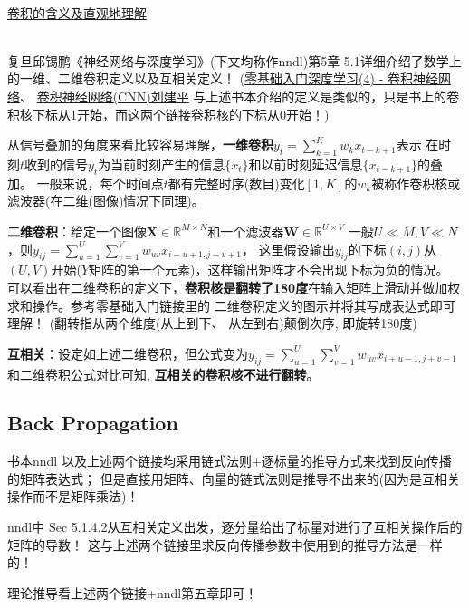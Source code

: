 \documentclass[UTF8]{article}
\begin{document}
\hspace*{\fill} \\
    \href{https://www.zhihu.com/question/22298352/answer/637156871}{卷积的含义及直观地理解}

\hspace*{\fill} \\
    复旦邱锡鹏《神经网络与深度学习》(下文均称作nndl)第5章 5.1详细介绍了数学上的一维、二维卷积定义以及互相关定义！
    (\href{https://www.zybuluo.com/hanbingtao/note/485480}{零基础入门深度学习(4) - 卷积神经网络}、
    \href{https://www.cnblogs.com/pinard/p/6483207.html}{卷积神经网络(CNN)刘建平}
    与上述书本介绍的定义是类似的，只是书上的卷积核下标从1开始，而这两个链接卷积核的下标从0开始！)

    从信号叠加的角度来看比较容易理解，\textbf{一维卷积}$y_{t}=\sum_{k=1}^{K} w_{k} x_{t-k+1}$表示
    在时刻$t$收到的信号$y_t$为当前时刻产生的信息$\{x_{t}\}$和以前时刻延迟信息$\{x_{t-k+1}\}$的叠加。
    一般来说，每个时间点$t$都有完整时序(数目)变化$[1,K]$的$w_{k}$被称作卷积核或滤波器(在二维(图像)情况下同理)。

    \textbf{二维卷积}：给定一个图像$\boldsymbol{X} \in \mathbb{R}^{M \times N}$和一个滤波器$\boldsymbol{W} \in \mathbb{R}^{U \times V}$
    一般$U \ll M, V \ll N$，则$y_{i j}=\sum_{u=1}^{U} \sum_{v=1}^{V} w_{u v} x_{i-u+1, j-v+1}$，
    这里假设输出$y_{ij}$的下标$(i, j)$从$(U, V)$开始($Y$矩阵的第一个元素)，这样输出矩阵才不会出现下标为负的情况。
    可以看出在二维卷积的定义下，\textbf{卷积核是翻转了180度}在输入矩阵上滑动并做加权求和操作。参考零基础入门链接里的
    二维卷积定义的图示并将其写成表达式即可理解！
    (翻转指从两个维度(从上到下、 从左到右)颠倒次序, 即旋转180度)

    \textbf{互相关}：设定如上述二维卷积，但公式变为$y_{i j}=\sum_{u=1}^{U} \sum_{v=1}^{V} w_{u v} x_{i+u-1, j+v-1}$
    和二维卷积公式对比可知, \textbf{互相关的卷积核不进行翻转}。

    \subsection{Back Propagation}
    书本nndl 以及上述两个链接均采用链式法则+逐标量的推导方式来找到反向传播的矩阵表达式；
    但是直接用矩阵、向量的链式法则是推导不出来的(因为是互相关操作而不是矩阵乘法)！

    nndl中 Sec 5.1.4.2从互相关定义出发，逐分量给出了标量对进行了互相关操作后的矩阵的导数！
    这与上述两个链接里求反向传播参数中使用到的推导方法是一样的！

    理论推导看上述两个链接+nndl第五章即可！
\end{document}
